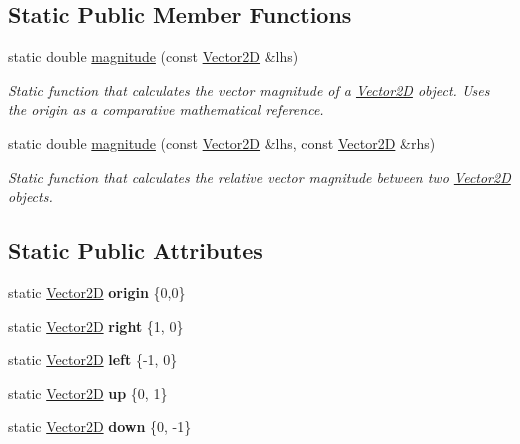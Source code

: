 \subsection*{Static Public Member Functions}
\begin{DoxyCompactItemize}
\item 
static double \hyperlink{class_vector2_d_a73d35a880a2f3d262b14ac8aaf5914db}{magnitude} (const \hyperlink{class_vector2_d}{Vector2D} \&lhs)
\begin{DoxyCompactList}\small\item\em Static function that calculates the vector magnitude of a \hyperlink{class_vector2_d}{Vector2D} object. Uses the origin as a comparative mathematical reference. \end{DoxyCompactList}\item 
static double \hyperlink{class_vector2_d_ac7b3cebbfa7c84c9750c30a6c030ffa8}{magnitude} (const \hyperlink{class_vector2_d}{Vector2D} \&lhs, const \hyperlink{class_vector2_d}{Vector2D} \&rhs)
\begin{DoxyCompactList}\small\item\em Static function that calculates the relative vector magnitude between two \hyperlink{class_vector2_d}{Vector2D} objects. \end{DoxyCompactList}\end{DoxyCompactItemize}
\subsection*{Static Public Attributes}
\begin{DoxyCompactItemize}
\item 
\mbox{\label{class_vector2_d_aa7a23308562639dc04b9fe30b2e30008}} 
static \hyperlink{class_vector2_d}{Vector2D} {\bfseries origin} \{0,0\}
\item 
\mbox{\label{class_vector2_d_aa48eacf081c0ffd578ff0687bd261580}} 
static \hyperlink{class_vector2_d}{Vector2D} {\bfseries right} \{1, 0\}
\item 
\mbox{\label{class_vector2_d_a9de8398e8d132c017571a911bf20d242}} 
static \hyperlink{class_vector2_d}{Vector2D} {\bfseries left} \{-\/1, 0\}
\item 
\mbox{\label{class_vector2_d_a5ea1302008e7f6827a1153cd3d5f3ef7}} 
static \hyperlink{class_vector2_d}{Vector2D} {\bfseries up} \{0, 1\}
\item 
\mbox{\label{class_vector2_d_aadd75c5ef76f3f4071c6fe1a2dc27c7b}} 
static \hyperlink{class_vector2_d}{Vector2D} {\bfseries down} \{0, -\/1\}
\end{DoxyCompactItemize}
